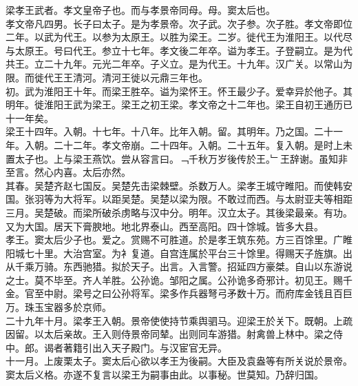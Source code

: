 \documentclass{zhvt-classic}
\begin{document}

\hspace*{2em}梁孝王武者。孝文皇帝子也。而与孝景帝同母。母。窦太后也。\\
\hspace*{2em}孝文帝凡四男。长子曰太子。是为孝景帝。次子武。次子参。次子胜。孝文帝即位二年。以武为代王。以参为太原王。以胜为梁王。二岁。徙代王为淮阳王。以代尽与太原王。号曰代王。参立十七年。孝文後二年卒。谥为孝王。子登嗣立。是为代共王。立二十九年。元光二年卒。子义立。是为代王。十九年。汉广关。以常山为限。而徙代王王清河。清河王徙以元鼎三年也。\\
\hspace*{2em}初。武为淮阳王十年。而梁王胜卒。谥为梁怀王。怀王最少子。爱幸异於他子。其明年。徙淮阳王武为梁王。梁王之初王梁。孝文帝之十二年也。梁王自初王通历已十一年矣。\\
\hspace*{2em}梁王十四年。入朝。十七年。十八年。比年入朝。留。其明年。乃之国。二十一年。入朝。二十二年。孝文帝崩。二十四年。入朝。二十五年。复入朝。是时上未置太子也。上与梁王燕饮。尝从容言曰。﹁千秋万岁後传於王。﹂王辞谢。虽知非至言。然心内喜。太后亦然。\\
\hspace*{2em}其春。吴楚齐赵七国反。吴楚先击梁棘壁。杀数万人。梁孝王城守睢阳。而使韩安国。张羽等为大将军。以距吴楚。吴楚以梁为限。不敢过而西。与太尉亚夫等相距三月。吴楚破。而梁所破杀虏略与汉中分。明年。汉立太子。其後梁最亲。有功。又为大国。居天下膏腴地。地北界泰山。西至高阳。四十馀城。皆多大县。\\
\hspace*{2em}孝王。窦太后少子也。爱之。赏赐不可胜道。於是孝王筑东苑。方三百馀里。广睢阳城七十里。大治宫室。为衤复道。自宫连属於平台三十馀里。得赐天子旌旗。出从千乘万骑。东西驰猎。拟於天子。出言。入言警。招延四方豪桀。自山以东游说之士。莫不毕至。齐人羊胜。公孙诡。邹阳之属。公孙诡多奇邪计。初见王。赐千金。官至中尉。梁号之曰公孙将军。梁多作兵器弩弓矛数十万。而府库金钱且百巨万。珠玉宝器多於京师。\\
\hspace*{2em}二十九年十月。梁孝王入朝。景帝使使持节乘舆驷马。迎梁王於关下。既朝。上疏因留。以太后亲故。王入则侍景帝同辇。出则同车游猎。射禽兽上林中。梁之侍中。郎。谒者著籍引出入天子殿门。与汉宦官无异。\\
\hspace*{2em}十一月。上废栗太子。窦太后心欲以孝王为後嗣。大臣及袁盎等有所关说於景帝。窦太后义格。亦遂不复言以梁王为嗣事由此。以事秘。世莫知。乃辞归国。\\
\end{document}
